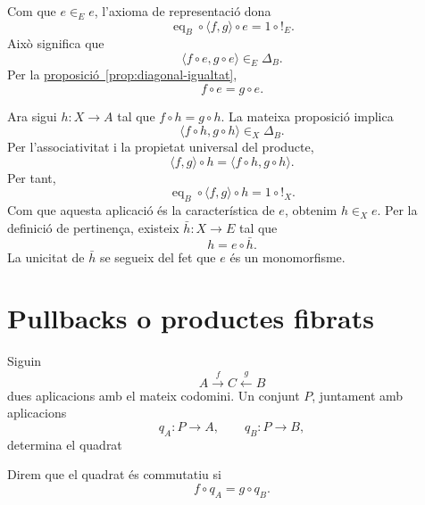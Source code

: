 \begin{prova}
Com que \(e\in_E e\), l'axioma de representació dona
\[
\operatorname{eq}_B\circ\langle f,g\rangle\circ e
=1\circ {!}_E.
\]
Això significa que
\[
\langle f\circ e,g\circ e\rangle\in_E\Delta_B.
\]
Per la \hyperref[prop:diagonal-igualtat]{proposició~\ref*{prop:diagonal-igualtat}},
\[
f\circ e=g\circ e.
\]

Ara sigui \(h:X\to A\) tal que \(f\circ h=g\circ h\). La mateixa proposició implica
\[
\langle f\circ h,g\circ h\rangle\in_X\Delta_B.
\]
Per l'associativitat i la propietat universal del producte,
\[
\langle f,g\rangle\circ h
=\langle f\circ h,g\circ h\rangle.
\]
Per tant,
\[
\operatorname{eq}_B\circ\langle f,g\rangle\circ h
=1\circ {!}_X.
\]
Com que aquesta aplicació és la característica de \(e\), obtenim \(h\in_X e\). Per la definició de pertinença, existeix \(\bar h:X\to E\) tal que
\[
h=e\circ\bar h.
\]
La unicitat de \(\bar h\) se segueix del fet que \(e\) és un monomorfisme.
\end{prova}

\section{Pullbacks o productes fibrats}\label{pullbacks}

Siguin
\[
A\xrightarrow{f}C\xleftarrow{g}B
\]
dues aplicacions amb el mateix codomini. Un conjunt \(P\), juntament amb aplicacions
\[
q_A:P\to A,
\qquad
q_B:P\to B,
\]
determina el quadrat
\begin{center}
\end{center}
Direm que el quadrat és commutatiu si
\[
f\circ q_A=g\circ q_B.
\]

